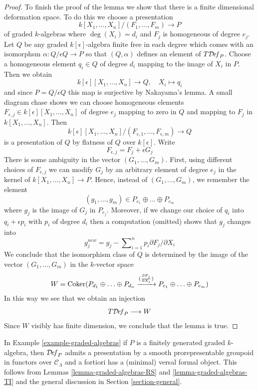 \begin{proof}
\medskip\noindent
To finish the proof of the lemma we show that there is a finite
dimensional deformation space. To do this we
choose a presentation
$$
k[X_1, \ldots, X_n]/(F_1, \ldots, F_m) \longrightarrow P
$$
of graded $k$-algebras where $\deg(X_i) = d_i$ and
$F_j$ is homogeneous of degree $e_j$.
Let $Q$ be any graded $k[\epsilon]$-algebra
finite free in each degree which comes with an isomorphsm
$\alpha : Q/\epsilon Q \to P$ so that $(Q, \alpha)$ defines
an element of $T\mathcal{D}\!\mathit{ef}_P$.
Choose a homogeneous element $q_i \in Q$ of degree $d_i$
mapping to the image of $X_i$ in $P$.
Then we obtain
$$
k[\epsilon][X_1, \ldots, X_n] \longrightarrow Q,\quad
X_i \longmapsto q_i
$$
and since $P = Q/\epsilon Q$ this map is surjective by Nakayama's lemma.
A small diagram chase shows we can choose homogeneous elements
$F_{\epsilon, j} \in k[\epsilon][X_1, \ldots, X_n]$ of degree $e_j$
mapping to zero in $Q$ and mapping to $F_j$ in $k[X_1, \ldots, X_n]$.
Then
$$
k[\epsilon][X_1, \ldots, X_n]/(F_{\epsilon, 1}, \ldots, F_{\epsilon, m})
\longrightarrow Q
$$
is a presentation of $Q$ by flatness of $Q$ over $k[\epsilon]$.
Write
$$
F_{\epsilon, j} =  F_j + \epsilon G_j
$$
There is some ambiguity in the vector $(G_1, \ldots, G_m)$.
First, using different choices of $F_{\epsilon, j}$
we can modify $G_j$ by an arbitrary element of degree $e_j$
in the kernel of $k[X_1, \ldots, X_n] \to P$.
Hence, instead of $(G_1, \ldots, G_m)$, we remember the
element
$$
(g_1, \ldots, g_m) \in P_{e_1} \oplus \ldots \oplus P_{e_m}
$$
where $g_j$ is the image of $G_j$ in $P_{e_j}$.
Moreover, if we change our choice of $q_i$ into $q_i + \epsilon p_i$
with $p_i$ of degree $d_i$ then a computation (omitted) shows
that $g_j$ changes into
$$
g_j^{new} = g_j - \sum\nolimits_{i = 1}^n p_i \partial F_j / \partial X_i
$$
We conclude that the isomorphism class of $Q$ is determined by the
image of the vector $(G_1, \ldots, G_m)$ in the $k$-vector space
$$
W  = \mathop{\mathrm{Coker}}(P_{d_1} \oplus \ldots \oplus P_{d_n}
\xrightarrow{(\frac{\partial F_j}{\partial X_i})}
P_{e_1} \oplus \ldots \oplus P_{e_m})
$$
In this way we see that we obtain an injection
$$
T\mathcal{D}\!\mathit{ef}_P \longrightarrow W
$$
Since $W$ visibly has finite dimension, we conclude that the lemma is true.
\end{proof}

\noindent
In Example \ref{example-graded-algebras} if $P$ is a finitely generated
graded $k$-algebra, then $\mathcal{D}\!\mathit{ef}_P$
admits a presentation by a smooth prorepresentable groupoid in functors
over $\mathcal{C}_\Lambda$
and a fortiori has a (minimal) versal formal object. This follows
from Lemmas \ref{lemma-graded-algebras-RS} and
\ref{lemma-graded-algebras-TI}
and the general discussion in Section \ref{section-general}.

